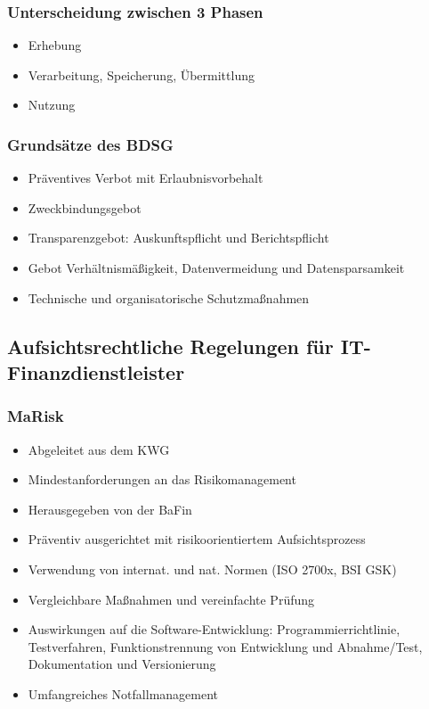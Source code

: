 \subsubsection{Unterscheidung zwischen 3 Phasen}
\begin{itemize}
	\item Erhebung
	\item Verarbeitung, Speicherung, Übermittlung
	\item Nutzung
\end{itemize}

\subsubsection{Grundsätze des BDSG}
\begin{itemize}
	\item Präventives Verbot mit Erlaubnisvorbehalt
	\item Zweckbindungsgebot
	\item Transparenzgebot: Auskunftspflicht und Berichtspflicht
	\item Gebot Verhältnismäßigkeit, Datenvermeidung und Datensparsamkeit
	\item Technische und organisatorische Schutzmaßnahmen
\end{itemize}


\subsection{Aufsichtsrechtliche Regelungen für IT-Finanzdienstleister}

\subsubsection{MaRisk}
\begin{itemize}
	\item Abgeleitet aus dem KWG
	\item Mindestanforderungen an das Risikomanagement
	\item Herausgegeben von der BaFin
	\item Präventiv ausgerichtet mit risikoorientiertem Aufsichtsprozess
	\item Verwendung von internat. und nat. Normen (ISO 2700x, BSI GSK)
	\item Vergleichbare Maßnahmen und vereinfachte Prüfung
	\item Auswirkungen auf die Software-Entwicklung: Programmierrichtlinie, Testverfahren, Funktionstrennung von Entwicklung und Abnahme/Test, Dokumentation und Versionierung
	\item Umfangreiches Notfallmanagement
\end{itemize}


